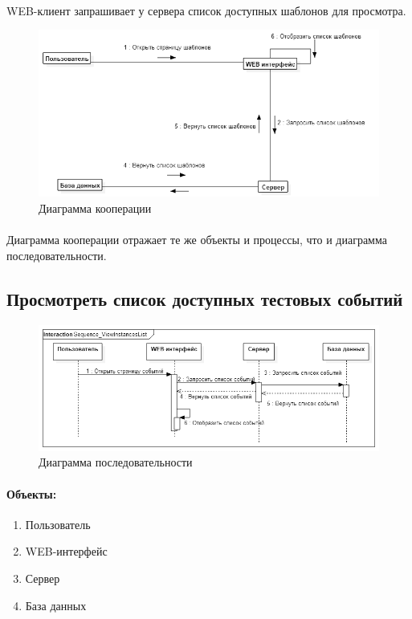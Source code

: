 \documentclass{article}
\begin{document}
        \paragraph{}
        WEB-клиент запрашивает у сервера список доступных шаблонов для просмотра.
        \begin{figure}[H]
            \includegraphics[width=\textwidth, center]
                {Communication_ViewTemplatesList}
            \caption{Диаграмма кооперации}
        \end{figure}
        \paragraph{}
        Диаграмма кооперации отражает те же объекты и процессы, что и диаграмма
        последовательности.
    
    
    \subsection{Просмотреть список доступных тестовых событий}
        \begin{figure}[H]
            \includegraphics[width=\textwidth, center]
                {Sequence_ViewInstancesList}
            \caption{Диаграмма последовательности}
        \end{figure}

        \paragraph{Объекты:}
        \begin{enumerate}
            \item Пользователь
            \item WEB-интерфейс
            \item Сервер
            \item База данных
        \end{enumerate}
\end{document}
